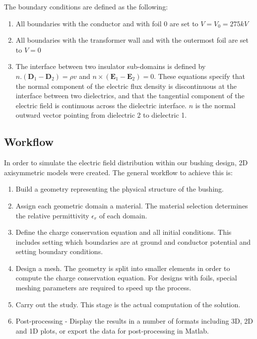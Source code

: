 The boundary conditions are defined as the following:
\begin{enumerate}
\item All boundaries with the conductor and with foil 0 are set to $V = V_0 = 275kV$
\item All boundaries with the transformer wall and with the outermost foil are set to $V = 0$
\item The interface between two insulator sub-domains is defined by $n.(\mathbf{D}_{1} -\mathbf{D}_{2}) = \rho v$ and $n\times(\mathbf{E}_{1} -\mathbf{E}_{2}) = 0$. These equations specify that the normal component of the electric flux density is discontinuous at the interface between two dielectrics, and that the tangential component of the electric field is continuous across the dielectric interface. $n$ is the normal outward vector pointing from dielectric 2 to dielectric 1.
\end{enumerate}

\subsection{Workflow}
In order to simulate the electric field distribution within our bushing design, 2D axisymmetric models were created. The general workflow to achieve this is:
\begin{enumerate}
\item Build a geometry representing the physical structure of the bushing.
\item Assign each geometric domain a material. The material selection determines the relative permittivity $\epsilon_r$ of each domain.
\item Define the charge conservation equation and all initial conditions. This includes setting which boundaries are at ground and conductor potential and setting boundary conditions.
\item Design a mesh. The geometry is split into smaller elements in order to compute the charge conservation equation. For designs with foils, special meshing parameters are required to speed up the process.
\item Carry out the study. This stage is the actual computation of the solution.
\item Post-processing - Display the results in a number of formats including 3D, 2D and 1D plots, or export the data for post-processing in Matlab.
\end{enumerate}


